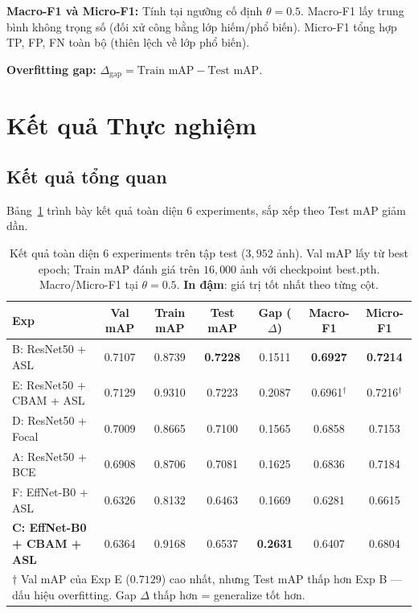 \documentclass[conference]{IEEEtran}
\begin{document}
\textbf{Macro-F1 và Micro-F1:}
Tính tại ngưỡng cố định $\theta = 0.5$.
Macro-F1 lấy trung bình không trọng số (đối xử công bằng lớp hiếm/phổ biến).
Micro-F1 tổng hợp TP, FP, FN toàn bộ (thiên lệch về lớp phổ biến).

\textbf{Overfitting gap:} $\Delta_{\text{gap}} = \text{Train mAP} - \text{Test mAP}$.

\section{Kết quả Thực nghiệm}
\label{sec:results}

\subsection{Kết quả tổng quan}

Bảng~\ref{tab:full_results} trình bày kết quả toàn diện 6 experiments,
sắp xếp theo Test mAP giảm dần.

\begin{table}[t]
  \caption{Kết quả toàn diện 6 experiments trên tập test ($3{,}952$ ảnh).
           Val mAP lấy từ best epoch; Train mAP đánh giá trên $16{,}000$ ảnh
           với checkpoint best.pth. Macro/Micro-F1 tại $\theta = 0.5$.
           \textbf{In đậm}: giá trị tốt nhất theo từng cột.}
  \label{tab:full_results}
  \centering
  \begin{tabular}{lcccccc}
    \toprule
    \textbf{Exp} & \textbf{Val mAP} & \textbf{Train mAP}
      & \textbf{Test mAP} & \textbf{Gap ($\Delta$)} & \textbf{Macro-F1} & \textbf{Micro-F1} \\
    \midrule
    B: ResNet50 + ASL           & 0.7107 & 0.8739 & \textbf{0.7228} & 0.1511 & \textbf{0.6927} & \textbf{0.7214} \\
    E: ResNet50 + CBAM + ASL    & 0.7129 & 0.9310 & 0.7223          & 0.2087 & 0.6961$^\dagger$ & 0.7216$^\dagger$ \\
    D: ResNet50 + Focal         & 0.7009 & 0.8665 & 0.7100          & 0.1565 & 0.6858          & 0.7153 \\
    A: ResNet50 + BCE           & 0.6908 & 0.8706 & 0.7081          & 0.1625 & 0.6836          & 0.7184 \\
    F: EffNet-B0 + ASL          & 0.6326 & 0.8132 & 0.6463          & 0.1669 & 0.6281          & 0.6615 \\
    \textbf{C: EffNet-B0 + CBAM + ASL} & 0.6364 & 0.9168 & 0.6537 & \textbf{0.2631} & 0.6407 & 0.6804 \\
    \bottomrule
    \multicolumn{7}{l}{%
      $\dagger$ Val mAP của Exp E ($0.7129$) cao nhất, nhưng Test mAP thấp hơn Exp B ---
      dấu hiệu overfitting. \quad
      Gap $\Delta$ thấp hơn = generalize tốt hơn.
    }
  \end{tabular}
\end{table}
\end{document}

